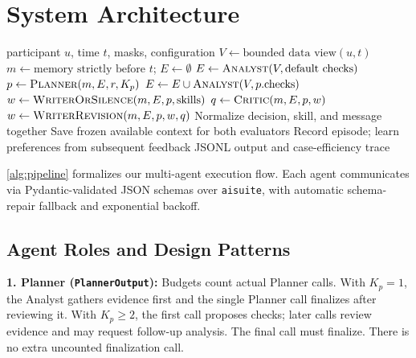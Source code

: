 \documentclass{article}
\begin{document}
\section{System Architecture}
\label{sec:system}

\begin{algorithm}[t]
  \caption{Corrected Multi-Agent Coaching Pipeline}
  \label{alg:pipeline}
  \begin{algorithmic}[1]
     participant $u$, time $t$, masks, configuration
    \STATE $V\gets\text{bounded data view}(u,t)$
    \STATE $m\gets\text{memory strictly before }t$; $E\gets\emptyset$
    \STATE $E\gets\textsc{Analyst}(V,\text{default checks})$
    \ENDIF
    \STATE $p\gets\textsc{Planner}(m,E,r,K_p)$
    \ENDIF
    \STATE $E\gets E\cup\textsc{Analyst}(V,p.\text{checks})$
    \ENDFOR
    \STATE $w\gets\textsc{WriterOrSilence}(m,E,p,\text{skills})$
    \STATE $q\gets\textsc{Critic}(m,E,p,w)$
    \ENDIF
    \STATE $w\gets\textsc{WriterRevision}(m,E,p,w,q)$
    \ENDFOR
    \STATE Normalize decision, skill, and message together
    \STATE Save frozen available context for both evaluators
    \STATE Record episode; learn preferences from subsequent feedback
     JSONL output and case-efficiency trace
  \end{algorithmic}
\end{algorithm}

\cref{alg:pipeline} formalizes our multi-agent execution flow. Each agent communicates via Pydantic-validated JSON schemas over \texttt{aisuite}, with automatic schema-repair fallback and exponential backoff.

\subsection{Agent Roles and Design Patterns}

\textbf{1. Planner (\texttt{PlannerOutput}):} Budgets count actual Planner calls. With $K_p=1$, the Analyst gathers evidence first and the single Planner call finalizes after reviewing it. With $K_p\ge2$, the first call proposes checks; later calls review evidence and may request follow-up analysis. The final call must finalize. There is no extra uncounted finalization call.
\end{document}
